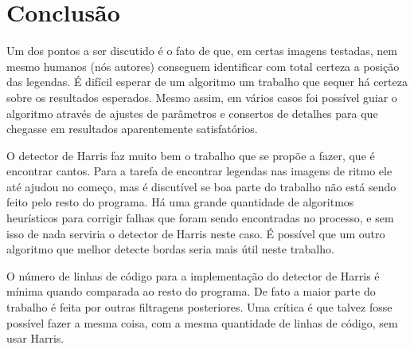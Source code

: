 \documentclass[12pt]{article}
\begin{document}
\section{Conclusão}

Um  dos pontos a  ser discutido  é o  fato de  que, em  certas imagens
testadas, nem  mesmo humanos  (nós autores) conseguem  identificar com
total  certeza  a  posição  das  legendas. É  difícil  esperar  de  um
algoritmo  um  trabalho que  sequer  há  certeza  sobre os  resultados
esperados. Mesmo assim, em vários casos foi possível guiar o algoritmo
através  de ajustes  de parâmetros  e consertos  de detalhes  para que
chegasse em resultados aparentemente satisfatórios.

O detector de  Harris faz muito bem o trabalho que  se propõe a fazer,
que  é encontrar  cantos.  Para  a  tarefa de  encontrar legendas  nas
imagens de  ritmo ele até  ajudou no começo,  mas é discutível  se boa
parte do trabalho não está sendo  feito pelo resto do programa. Há uma
grande quantidade  de algoritmos heurísticos para  corrigir falhas que
foram sendo  encontradas no  processo, e sem  isso de nada  serviria o
detector de Harris  neste caso. É possível que  um outro algoritmo que
melhor detecte bordas seria mais útil neste trabalho. 

O  número de  linhas de  código para  a implementação  do  detector de
Harris é mínima quando comparada ao resto do programa. De fato a maior
parte  do trabalho  é  feita por  outras  filtragens posteriores.  Uma
crítica é que  talvez fosse possível fazer a mesma  coisa, com a mesma
quantidade de linhas de código, sem usar Harris.



\end{document}
